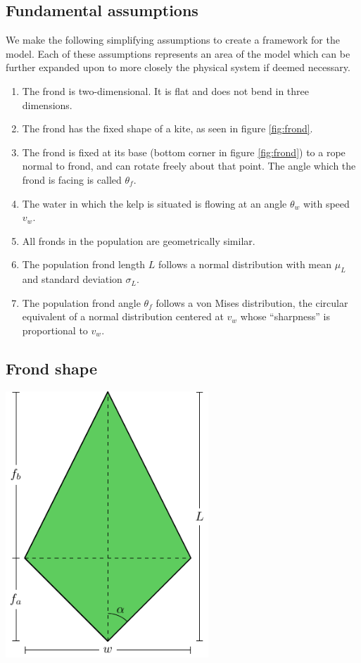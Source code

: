 \documentclass{article}
\newenvironment{mcfig}
	{\par\medskip\noindent\minipage{\linewidth}}
	{\endminipage\par\medskip}
\begin{document}
\begin{multicols}{2}
\subsection{Fundamental assumptions}
We make the following simplifying assumptions to create a framework for the model. Each of these assumptions represents an area of the model which can be further expanded upon to more closely the physical system if deemed necessary.
\begin{enumerate}
	\item The frond is two-dimensional. It is flat and does not bend in three dimensions.
	\item The frond has the fixed shape of a kite, as seen in figure \ref{fig:frond}.
	\item The frond is fixed at its base (bottom corner in figure \ref{fig:frond}) to a rope normal to frond, and can rotate freely about that point. The angle which the frond is facing is called $\theta_f$.
	\item The water in which the kelp is situated is flowing at an angle $\theta_w$ with speed $v_w$.
	\item All fronds in the population are geometrically similar.
	\item The population frond length $L$ follows a normal distribution with mean $\mu_L$ and standard deviation $\sigma_L$.
	\item The population frond angle $\theta_f$ follows a von Mises distribution, the circular equivalent of a normal distribution centered at $v_w$ whose ``sharpness'' is proportional to $v_w$.
\end{enumerate}

\subsection{Frond shape}
\label{sec:shape}

\begin{mcfig}
	\centering
	\includegraphics[width=3in]{frond}
	\label{fig:frond}
\end{mcfig}


\end{multicols}
\end{document}
